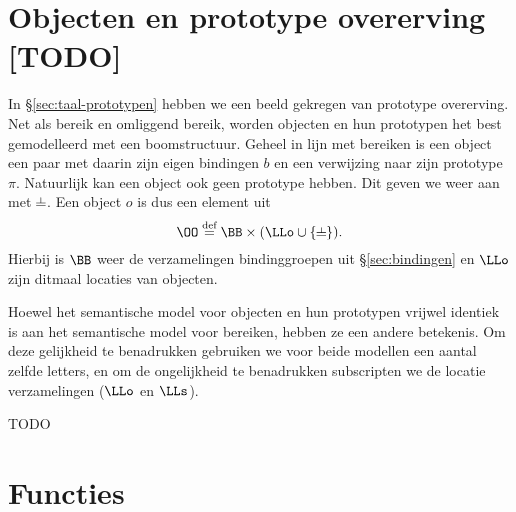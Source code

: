 \section{Objecten en prototype overerving [TODO]}
\label{sec:sem-objecten}

In §\ref{sec:taal-prototypen} hebben we een beeld gekregen van prototype overerving. Net als bereik en omliggend bereik, worden objecten en hun prototypen het best gemodelleerd met een boomstructuur. Geheel in lijn met bereiken is een object een paar met daarin zijn eigen bindingen $b$ en een verwijzing naar zijn prototype $\pi$. Natuurlijk kan een object ook geen prototype hebben. Dit geven we weer aan met $\nil$. Een object $o$ is dus een element uit
%
\begin{equation*}
  \OO \DEF \BB \times (\LLo \cup \{\nil\}).
\end{equation*}
%
Hierbij is $\BB$ weer de verzamelingen bindinggroepen uit §\ref{sec:bindingen} en $\LLo$ zijn ditmaal locaties van objecten.

Hoewel het semantische model voor objecten en hun prototypen vrijwel identiek is aan het semantische model voor bereiken, hebben ze een andere betekenis. Om deze gelijkheid te benadrukken gebruiken we voor beide modellen een aantal zelfde letters, en om de ongelijkheid te benadrukken subscripten we de locatie verzamelingen ($\LLo$ en $\LLs$).

TODO

\section{Functies}
\label{sec:sem-functies}

